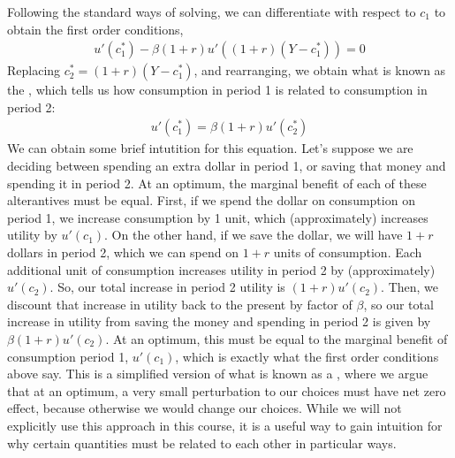 Following the standard ways of solving, we can differentiate with respect to $c_1$ to obtain the first order conditions,
\begin{align*}
    u'(c_1^*) - \beta (1 + r) u'((1 + r) (Y - c_1^*)) = 0
\end{align*}
Replacing $c_2^* = (1 + r) (Y - c_1^*)$, and rearranging, we obtain what is known as the , which tells us how consumption in period 1 is related to consumption in period 2:
\begin{align*} \label{eq:euler}
    u'(c_1^*) = \beta (1 + r) u'(c_2^*)
\end{align*}
We can obtain some brief intutition for this equation. Let's suppose we are deciding between spending an extra dollar in period 1, or saving that money and spending it in period 2. At an optimum, the marginal benefit of each of these alterantives must be equal. First, if we spend the dollar on consumption on period 1, we increase consumption by 1 unit, which (approximately) increases utility by $u'(c_1)$. On the other hand, if we save the dollar, we will have $1 + r$ dollars in period 2, which we can spend on $1 + r$ units of consumption. Each additional unit of consumption increases utility in period 2 by (approximately) $u'(c_2)$. So, our total increase in period 2 utility is $(1 + r) u'(c_2)$. Then, we discount that increase in utility back to the present by factor of $\beta$, so our total increase in utility from saving the money and spending in period 2 is given by $\beta (1 + r) u'(c_2)$. At an optimum, this must be equal to the marginal benefit of consumption period 1, $u'(c_1)$, which is exactly what the first order conditions above say. This is a simplified version of what is known as a , where we argue that at an optimum, a very small perturbation to our choices must have net zero effect, because otherwise we would change our choices. While we will not explicitly use this approach in this course, it is a useful way to gain intuition for why certain quantities must be related to each other in particular ways. 

